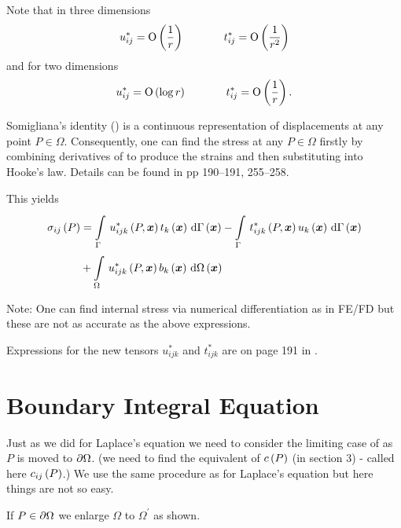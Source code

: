 Note that in three dimensions
\begin{displaymath}
  u_{ij}^{*} =  \mathrm{O}\left( \frac{1}{r} \right) \hspace{0.5in} t_{ij}^{*} = 
   \mathrm{O}\left( \frac{1}{r^{2}} \right) 
\end{displaymath}
 and for two dimensions
\begin{displaymath}
  u_{ij}^{*} =  \mathrm{O}\left( \log r \right) \hspace{0.5in}  t_{ij}^{*} =  \mathrm{O}\left( \frac{1}{r} \right) .
\end{displaymath}


Somigliana's identity () is a continuous representation of
displacements at any point $P \in \Omega$.  Consequently, one can find the
stress at any $P \in \Omega$ firstly by combining derivatives of
 to produce the strains and then substituting into Hooke's law.
Details can be found in \citet{brebbia:1984} pp 190--191, 255--258.

This yields
\begin{align*}
  \fnof{\sigma_{ij}}{P} &= \gint{\Gamma}{}{\fnof{u_{ijk}^{*}}{P,\vectr{x}}
    \fnof{t_{k}}{\vectr{x}}}{\fnof{\Gamma}{\vectr{x}}} -
    \gint{\Gamma}{}{\fnof{t_{ijk}^{*}}{P,\vectr{x}}
    \fnof{u_{k}}{\vectr{x}}}{\fnof{\Gamma}{\vectr{x}}} \\ 
  &+ \gint{\Omega}{}{\fnof{u_{ijk}^{*}}{P,\vectr{x}}
    \fnof{b_{k}}{\vectr{x}}}{\fnof{\Omega}{\vectr{x}}}
\end{align*}

Note: One can find internal stress via numerical differentiation as in FE/FD
but these are not as accurate as the above expressions.

Expressions for the new tensors $ u_{ijk}^{*}$ and $t_{ijk}^{*}$ are on page
191 in \citep{brebbia:1984}.

\section{Boundary Integral Equation}
\label{sec:BIE,sec4.10}

Just as we did for Laplace's equation we need to consider the limiting case of
 as $P$ is moved to $\partial \Omega$. (\ie we need to find the
equivalent of $ c\left( P \right) $ (in section 3) - called here $ c_{ij}\left( P \right) $.)
We use the same procedure as for Laplace's equation but here things are not so
easy.

If  $P \in \partial \Omega$ we enlarge $\Omega$ to $\Omega^{\prime}$ as 
shown.

